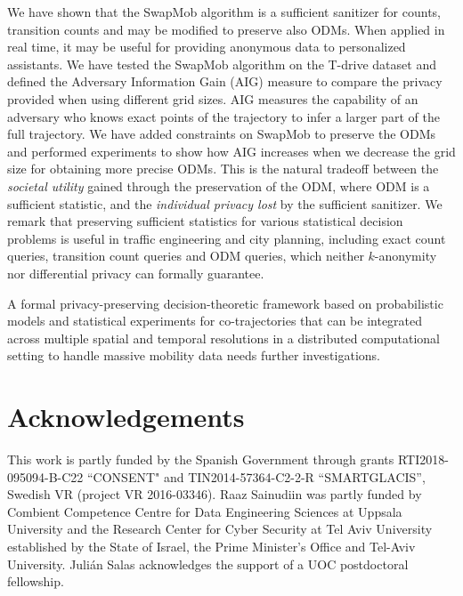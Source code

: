 \documentclass[times,twocolumn,final,authoryear]{elsarticle}
\begin{document}
{\color{blue}
We have shown that the SwapMob algorithm is a sufficient sanitizer for counts, transition counts and may be modified to preserve also ODMs.
When applied in real time, it may be useful for providing anonymous data to personalized assistants. 
We have tested the SwapMob algorithm on the T-drive dataset and defined 
the Adversary Information Gain (AIG) measure to compare the privacy provided when using different grid sizes.
AIG measures the capability of an adversary who knows exact points of the trajectory to infer a larger part of the full trajectory.
We have added constraints on SwapMob to preserve the ODMs and performed experiments to show how AIG
increases when we decrease the grid size for obtaining more precise ODMs.}
This is the natural tradeoff between the {\em societal utility} gained through the preservation of the ODM, where ODM is a sufficient statistic, and the {\em individual privacy lost} by the sufficient sanitizer. 
We remark that preserving sufficient statistics for various statistical decision problems is useful in traffic engineering and city planning, including exact count queries, transition count queries and ODM queries, which neither $k$-anonymity nor differential privacy can formally guarantee.


A formal privacy-preserving decision-theoretic framework based on probabilistic models and statistical experiments for co-trajectories that can be integrated across multiple spatial and temporal resolutions in a distributed computational setting to handle massive mobility data needs further investigations.

\section*{Acknowledgements}
This work is partly funded by the Spanish Government through grants  RTI2018-095094-B-C22 ``CONSENT" and TIN2014-57364-C2-2-R ``SMARTGLACIS'', Swedish VR (project VR 2016-03346). Raaz Sainudiin was partly funded by Combient Competence Centre for Data Engineering Sciences at Uppsala University and the Research Center for Cyber Security at Tel Aviv University established by the State of Israel, the Prime Minister's Office and Tel-Aviv University. 
Juli\'{a}n Salas acknowledges the support of a UOC postdoctoral fellowship.






\end{document}
